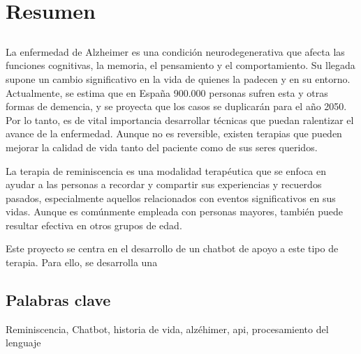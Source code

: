 \chapter*{Resumen}
\section*{\tituloPortadaVal}
La enfermedad de Alzheimer es una condición neurodegenerativa que afecta las funciones cognitivas, la memoria, el pensamiento y el comportamiento. Su llegada supone un cambio significativo en la vida de quienes la padecen y en su entorno. Actualmente, se estima que en España 900.000 personas sufren esta y otras formas de demencia, y se proyecta que los casos se duplicarán para el año 2050. Por lo tanto, es de vital importancia desarrollar técnicas que puedan ralentizar el avance de la enfermedad. Aunque no es reversible, existen terapias que pueden mejorar la calidad de vida tanto del paciente como de sus seres queridos.

La terapia de reminiscencia es una modalidad terapéutica que se enfoca en ayudar a las personas a recordar y compartir sus experiencias y recuerdos pasados, especialmente aquellos relacionados con eventos significativos en sus vidas. Aunque es comúnmente empleada con personas mayores, también puede resultar efectiva en otros grupos de edad.

Este proyecto se centra en el desarrollo de un chatbot de apoyo a este tipo de terapia. Para ello, se desarrolla una 

\section*{Palabras clave}
   
\noindent Reminiscencia, Chatbot, historia de vida, alzéhimer, api, procesamiento del lenguaje

   


